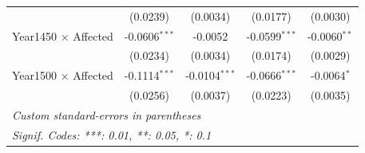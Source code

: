 \begin{table}[H]
\begin{tabular}{lcccc}
                                                    & (0.0239)        & (0.0034)        & (0.0177)              & (0.0030)\\   
   Year1450 $\times$ Affected                       & -0.0606$^{***}$ & -0.0052         & -0.0599$^{***}$       & -0.0060$^{**}$\\   
                                                    & (0.0234)        & (0.0034)        & (0.0174)              & (0.0029)\\   
   Year1500 $\times$ Affected                       & -0.1114$^{***}$ & -0.0104$^{***}$ & -0.0666$^{***}$       & -0.0064$^{*}$\\   
                                                    & (0.0256)        & (0.0037)        & (0.0223)              & (0.0035)\\   
   \midrule \midrule
   \multicolumn{5}{l}{\emph{Custom standard-errors in parentheses}}\\
   \multicolumn{5}{l}{\emph{Signif. Codes: ***: 0.01, **: 0.05, *: 0.1}}\\
\end{tabular}
\end{table}


